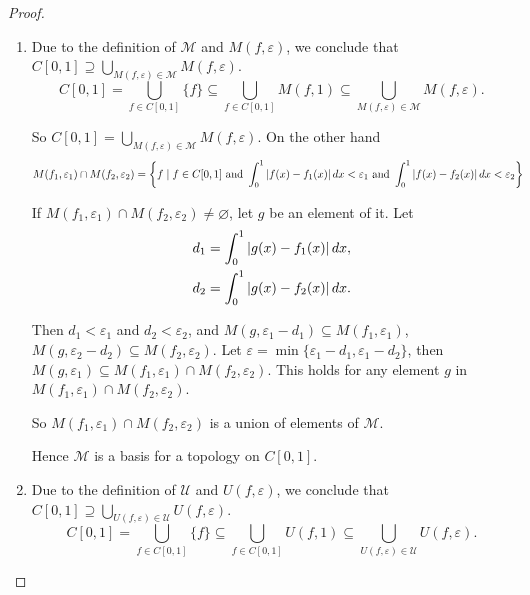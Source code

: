 \begin{proof}
	\begin{enumerate}[label={(\roman*)}]
		\item Due to the definition of $\mathcal{M}$ and $M(f, \varepsilon)$, we conclude that $C[0, 1] \supseteq \bigcup_{M(f, \varepsilon)\in \mathcal{M}} M(f, \varepsilon)$.
		      \[
			      C[0, 1] = \bigcup_{f\in C[0, 1]} \{ f \} \subseteq \bigcup_{f\in C[0, 1]} M(f, 1) \subseteq \bigcup_{M(f, \varepsilon)\in \mathcal{M}} M(f, \varepsilon).
		      \]

		      So $C[0, 1] = \bigcup_{M(f, \varepsilon)\in \mathcal{M}} M(f, \varepsilon)$. On the other hand
		      \begin{align*}
			      M(f_{1}, \varepsilon_{1})\cap M(f_{2}, \varepsilon_{2}) & = \left\{ f \mid f\in C[0, 1] \text{ and } \int^{1}_{0}\left\vert{f(x) - f_{1}(x)}\right\vert dx < \varepsilon_{1} \text{ and } \int^{1}_{0}\left\vert{f(x) - f_{2}(x)}\right\vert dx < \varepsilon_{2} \right\}
		      \end{align*}

              If $M(f_{1}, \varepsilon_{1})\cap M(f_{2}, \varepsilon_{2})\ne \varnothing$, let $g$ be an element of it. Let
              \[
                \begin{split}
                    d_{1} = \int^{1}_{0}\left\vert{g(x) - f_{1}(x)}\right\vert dx, \\
                    d_{2} = \int^{1}_{0}\left\vert{g(x) - f_{2}(x)}\right\vert dx.
                \end{split}
              \]

              Then $d_{1} < \varepsilon_{1}$ and $d_{2} < \varepsilon_{2}$, and $M(g, \varepsilon_{1} - d_{1})\subseteq M(f_{1}, \varepsilon_{1})$, $M(g, \varepsilon_{2} - d_{2})\subseteq M(f_{2}, \varepsilon_{2})$. Let $\varepsilon = \min\{ \varepsilon_{1} - d_{1}, \varepsilon_{1} - d_{2} \}$, then $M(g, \varepsilon_{1})\subseteq M(f_{1}, \varepsilon_{1})\cap M(f_{2}, \varepsilon_{2})$. This holds for any element $g$ in $M(f_{1}, \varepsilon_{1})\cap M(f_{2}, \varepsilon_{2})$.

              So $M(f_{1}, \varepsilon_{1})\cap M(f_{2}, \varepsilon_{2})$ is a union of elements of $\mathcal{M}$.

              Hence $\mathcal{M}$ is a basis for a topology on $C[0, 1]$.
		\item Due to the definition of $\mathcal{U}$ and $U(f, \varepsilon)$, we conclude that $C[0, 1]\supseteq \bigcup_{U(f, \varepsilon)\in \mathcal{U}} U(f, \varepsilon)$.
        \[
            C[0, 1] = \bigcup_{f\in C[0, 1]} \{ f \} \subseteq \bigcup_{f\in C[0, 1]} U(f, 1) \subseteq \bigcup_{U(f, \varepsilon)\in \mathcal{U}} U(f, \varepsilon).
        \]


\end{enumerate}
\end{proof}
